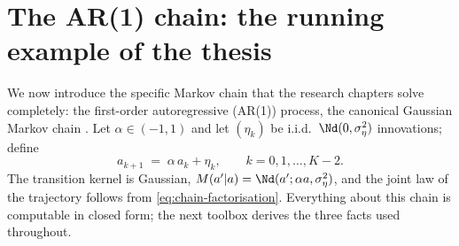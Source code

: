 \section{The AR(1) chain: the running example of the thesis}\label{sec:ar1}

We now introduce the specific Markov chain that the research chapters solve
completely: the first-order autoregressive (AR(1)) process, the canonical
Gaussian Markov chain \citep{brockwell1991time}. Let
$\alpha \in (-1, 1)$ and let $(\eta_k)$ be i.i.d.\ $\Nd(0, \sigma_\eta^2)$
innovations; define
\begin{equation}
  a_{k+1} \;=\; \alpha\, a_k + \eta_k ,
  \qquad k = 0, 1, \dots, K-2 .
  \label{eq:ar1}
\end{equation}
The transition kernel is Gaussian,
$M(a' | a) = \Nd(a'; \alpha a, \sigma_\eta^2)$, and the joint law of the
trajectory follows from \eqref{eq:chain-factorisation}. Everything about
this chain is computable in closed form; the next toolbox derives the three
facts used throughout.

